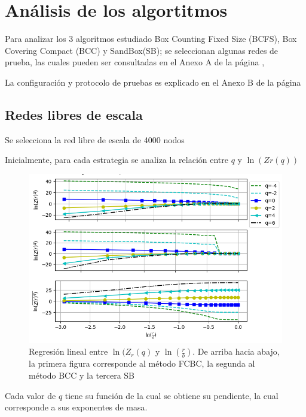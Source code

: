 \section{Análisis de los algortitmos}

Para analizar los 3 algoritmos estudiado Box Counting Fixed Size (BCFS), Box Covering Compact (BCC) y SandBox(SB); se seleccionan algunas redes de prueba, las cuales pueden ser consultadas en el Anexo A de la página \pageref{AnexoA},

La configuración y protocolo de pruebas es explicado en el Anexo B de la página\pageref{AnexoB}


\subsection{Redes libres de escala}

Se selecciona la red libre de escala de 4000 nodos 

Inicialmente, para cada estrategia se analiza la relación entre $q$ y $\ln(Zr(q))$

\begin{figure}[H]
    \centering
    \includegraphics[scale=0.8]{Capitulo4Multifractalidad/imagenes/scaleFree4000_TqLnrBCscaleFree4000Nodes.png}

    \caption{Regresión lineal entre $\ln(Z_r(q)$ y $\ln(\frac{r}{b})$. De arriba hacia abajo, la primera figura corresponde al método FCBC, la segunda al método BCC y la tercera SB}
\end{figure}

Cada valor de $q$ tiene su función de la cual se obtiene su pendiente, la cual corresponde a sus exponentes de masa.


